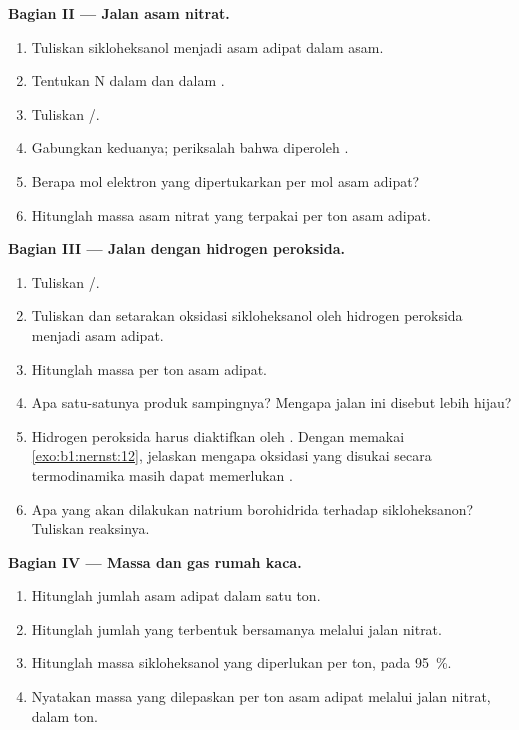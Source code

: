 \begin{problem}
\medskip
\noindent\textbf{Bagian II --- Jalan asam nitrat.}
\begin{enumerate}[resume]
  \item Tuliskan  sikloheksanol menjadi asam adipat dalam
        asam.
  \item Tentukan  N dalam  dan dalam .
  \item Tuliskan  /.
  \item Gabungkan keduanya; periksalah bahwa diperoleh
        .
  \item Berapa mol elektron yang dipertukarkan per mol asam adipat?
  \item Hitunglah massa asam nitrat yang terpakai per ton asam adipat.
\end{enumerate}

\medskip
\noindent\textbf{Bagian III --- Jalan dengan hidrogen peroksida.}
\begin{enumerate}[resume]
  \item Tuliskan  /.
  \item Tuliskan dan setarakan oksidasi sikloheksanol oleh hidrogen
        peroksida menjadi asam adipat.
  \item Hitunglah massa  per ton asam adipat.
  \item Apa satu-satunya produk sampingnya? Mengapa jalan ini disebut
        lebih hijau?
  \item Hidrogen peroksida harus diaktifkan oleh . Dengan memakai
        \cref{exo:b1:nernst:12}, jelaskan mengapa oksidasi yang disukai
        secara termodinamika masih dapat memerlukan .
  \item Apa yang akan dilakukan natrium borohidrida terhadap
        sikloheksanon? Tuliskan reaksinya.
\end{enumerate}

\medskip
\noindent\textbf{Bagian IV --- Massa dan gas rumah kaca.}
\begin{enumerate}[resume]
  \item Hitunglah jumlah asam adipat dalam satu ton.
  \item Hitunglah jumlah  yang terbentuk bersamanya melalui jalan
        nitrat.
  \item Hitunglah massa sikloheksanol yang diperlukan per ton, pada
         \qty{95}{\percent}.
  \item Nyatakan massa  yang dilepaskan per ton asam adipat
        melalui jalan nitrat, dalam ton.
\end{enumerate}
\end{problem}
